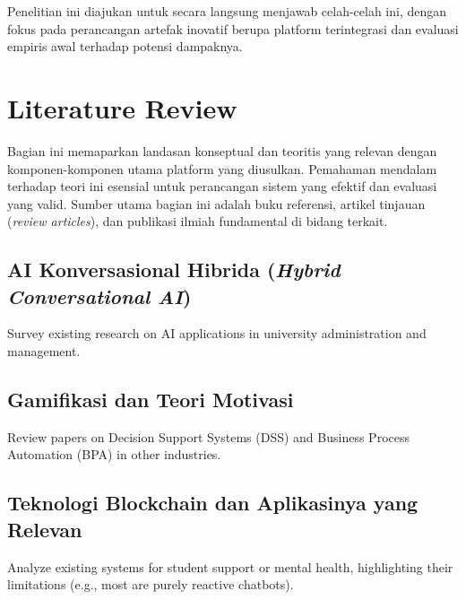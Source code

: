 Penelitian ini diajukan untuk secara langsung menjawab celah-celah ini, dengan fokus pada perancangan artefak inovatif berupa platform terintegrasi dan evaluasi empiris awal terhadap potensi dampaknya.


\section{Literature Review}
\label{sec:literature_review}

Bagian ini memaparkan landasan konseptual dan teoritis yang relevan dengan komponen-komponen utama platform yang diusulkan. Pemahaman mendalam terhadap teori ini esensial untuk perancangan sistem yang efektif dan evaluasi yang valid. Sumber utama bagian ini adalah buku referensi, artikel tinjauan (\textit{review articles}), dan publikasi ilmiah fundamental di bidang terkait.

\subsection{AI Konversasional Hibrida (\textit{Hybrid Conversational AI})}
\label{subsec:teori_ai_detail_revised}
Survey existing research on AI applications in university administration and management.

\subsection{Gamifikasi dan Teori Motivasi}
\label{subsec:teori_gamifikasi_detail_revised}
Review papers on Decision Support Systems (DSS) and Business Process Automation (BPA) in other industries.

\subsection{Teknologi Blockchain dan Aplikasinya yang Relevan}
\label{subsec:teori_blockchain_detail_revised}
Analyze existing systems for student support or mental health, highlighting their limitations (e.g., most are purely reactive chatbots).

